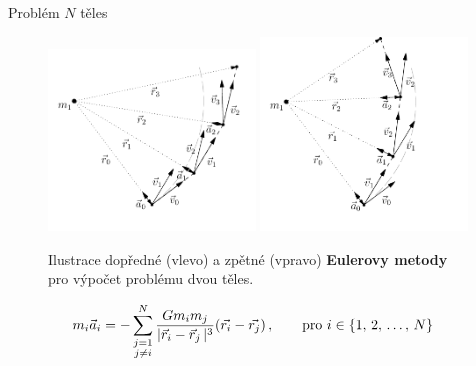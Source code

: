 \documentclass[xcolor=dvipsnames]{beamer}
\newcommand{\abs}[1]{\lvert #1 \,\rvert} %
\begin{document}
\begin{frame}[t]{\secname}{Problém $N$ těles}
	\begin{figure}
		\includegraphics[width=0.49\textwidth]{../asy/asteroidy-3.pdf}
		\includegraphics[width=0.49\textwidth]{../asy/asteroidy-4.pdf}
		\vspace{-1cm}
		\caption{\footnotesize{Ilustrace dopředné (vlevo) a zpětné (vpravo) \textbf{Eulerovy metody} pro výpočet problému dvou těles.}}
	\end{figure}
	\vspace{-0.5cm}
	\begin{align*}
		m_i\vec{a}_i &= -\sum_{\substack{j=1 \\ j\neq i}}^N \frac{Gm_im_j}{\abs{\vec{r}_i-\vec{r}_j}^3}(\vec{r_i}-\vec{r_j})\,, \qquad{\rm pro}\ i\in\{1,\,2,\,\dots,\,N\} \label{eq:nbody2}
	\end{align*}
\end{frame}

\end{document}
